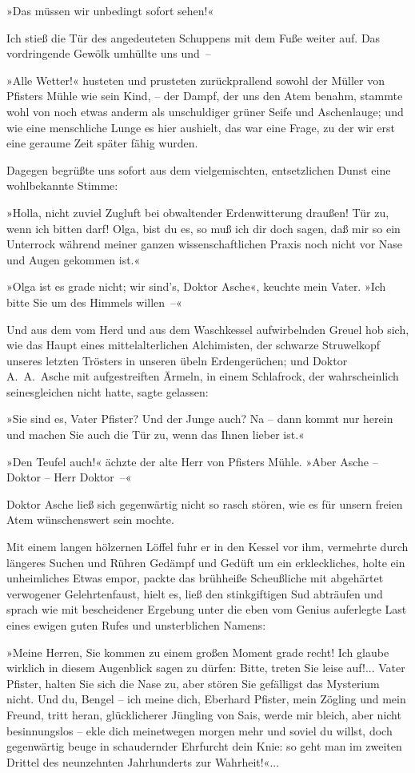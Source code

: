 »Das müssen wir unbedingt sofort sehen!«

Ich stieß die Tür des angedeuteten Schuppens mit dem Fuße weiter
auf. Das vordringende Gewölk umhüllte uns und~–

»Alle Wetter!« husteten und prusteten zurückprallend sowohl der
Müller von Pfisters Mühle wie sein Kind, – der Dampf, der uns den
Atem benahm, stammte wohl von noch etwas anderm als unschuldiger
grüner Seife und Aschenlauge; und wie eine menschliche Lunge es
hier aushielt, das war eine Frage, zu der wir erst eine geraume
Zeit später fähig wurden.

Dagegen begrüßte uns sofort aus dem vielgemischten, entsetzlichen
Dunst eine wohlbekannte Stimme:

»Holla, nicht zuviel Zugluft bei obwaltender Erdenwitterung
draußen! Tür zu, wenn ich bitten darf! Olga, bist du es, so muß ich
dir doch sagen, daß mir so ein Unterrock während meiner ganzen
wissenschaftlichen Praxis noch nicht vor Nase und Augen gekommen
ist.«

»Olga ist es grade nicht; wir sind's, Doktor Asche«, keuchte mein
Vater. »Ich bitte Sie um des Himmels willen~–«

Und aus dem vom Herd und aus dem Waschkessel aufwirbelnden Greuel
hob sich, wie das Haupt eines mittelalterlichen Alchimisten, der
schwarze Struwelkopf unseres letzten Trösters in unseren übeln
Erdengerüchen; und Doktor A.~A.~Asche mit aufgestreiften Ärmeln, in
einem Schlafrock, der wahrscheinlich seinesgleichen nicht hatte,
sagte gelassen:

»Sie sind es, Vater Pfister? Und der Junge auch? Na – dann kommt
nur herein und machen Sie auch die Tür zu, wenn das Ihnen lieber
ist.«

»Den Teufel auch!« ächzte der alte Herr von Pfisters Mühle. »Aber
Asche – Doktor – Herr Doktor~–«

Doktor Asche ließ sich gegenwärtig nicht so rasch stören, wie es
für unsern freien Atem wünschenswert sein mochte.

Mit einem langen hölzernen Löffel fuhr er in den Kessel vor ihm,
vermehrte durch längeres Suchen und Rühren Gedämpf und Gedüft um
ein erkleckliches, holte ein unheimliches Etwas empor, packte das
brühheiße Scheußliche mit abgehärtet verwogener Gelehrtenfaust,
hielt es, ließ den stinkgiftigen Sud abträufen und sprach wie mit
bescheidener Ergebung unter die eben vom Genius auferlegte Last
eines ewigen guten Rufes und unsterblichen Namens:

»Meine Herren, Sie kommen zu einem großen Moment grade recht! Ich
glaube wirklich in diesem Augenblick sagen zu dürfen: Bitte, treten
Sie leise auf!... Vater Pfister, halten Sie sich die Nase zu, aber
stören Sie gefälligst das Mysterium nicht. Und du, Bengel – ich
meine dich, Eberhard Pfister, mein Zögling und mein Freund, tritt
heran, glücklicherer Jüngling von Sais, werde mir bleich, aber
nicht besinnungslos – ekle dich meinetwegen morgen mehr und soviel
du willst, doch gegenwärtig beuge in schaudernder Ehrfurcht dein
Knie: so geht man im zweiten Drittel des neunzehnten Jahrhunderts
zur Wahrheit!«...

